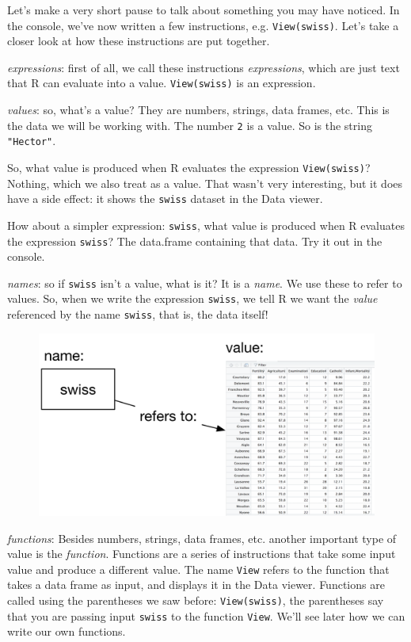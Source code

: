 \documentclass[]{article}
\theoremstyle{definition}
\theoremstyle{definition}
\theoremstyle{remark}
\begin{document}
Let's make a very short pause to talk about something you may have
noticed. In the console, we've now written a few instructions, e.g.
\texttt{View(swiss)}. Let's take a closer look at how these instructions
are put together.

\emph{expressions}: first of all, we call these instructions
\emph{expressions}, which are just text that R can evaluate into a
value. \texttt{View(swiss)} is an expression.

\emph{values}: so, what's a value? They are numbers, strings, data
frames, etc. This is the data we will be working with. The number
\texttt{2} is a value. So is the string \texttt{"Hector"}.

So, what value is produced when R evaluates the expression
\texttt{View(swiss)}? Nothing, which we also treat as a value. That
wasn't very interesting, but it does have a side effect: it shows the
\texttt{swiss} dataset in the Data viewer.

How about a simpler expression: \texttt{swiss}, what value is produced
when R evaluates the expression \texttt{swiss}? The data.frame
containing that data. Try it out in the console.

\emph{names}: so if \texttt{swiss} isn't a value, what is it? It is a
\emph{name}. We use these to refer to values. So, when we write the
expression \texttt{swiss}, we tell R we want the \emph{value} referenced
by the name \texttt{swiss}, that is, the data itself!

\begin{figure}[htbp]
\centering
\includegraphics{img/names_values.png}
\caption{}
\end{figure}

\emph{functions}: Besides numbers, strings, data frames, etc. another
important type of value is the \emph{function}. Functions are a series
of instructions that take some input value and produce a different
value. The name \texttt{View} refers to the function that takes a data
frame as input, and displays it in the Data viewer. Functions are called
using the parentheses we saw before: \texttt{View(swiss)}, the
parentheses say that you are passing input \texttt{swiss} to the
function \texttt{View}. We'll see later how we can write our own
functions.
\end{document}
